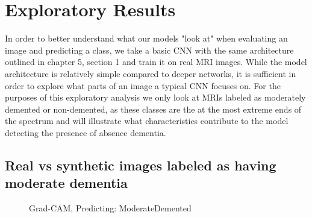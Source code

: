 \documentclass [MS] {uclathes}
\begin{document}
\section{Exploratory Results}
In order to better understand what our models "look at" when evaluating an image and predicting a class, we take a basic 
CNN with the same architecture outlined in chapter 5, section 1 and train it on real MRI images. While the model 
architecture is relatively simple compared to deeper networks, it is sufficient in order to explore what parts of an 
image a typical CNN focuses on. For the purposes of this exploratory analysis we only look at MRIs labeled as moderately 
demented or non-demented, as these classes are the at the most extreme ends of the spectrum and will illustrate what 
characteristics contribute to the model detecting the presence of absence dementia.

\subsection{Real vs synthetic images labeled as having moderate dementia}

\begin{figure}[H]
    \centering
    \hspace{0.001\textwidth}
    \caption{Grad-CAM, Predicting: ModerateDemented}
\end{figure}
\end{document}
